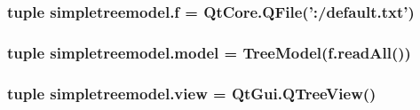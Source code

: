 \subsubsection[{f}]{\setlength{\rightskip}{0pt plus 5cm}tuple simpletreemodel.\+f = Qt\+Core.\+Q\+File('\+:/default.\+txt')}\label{namespacesimpletreemodel_a3f035ef87a5aa2abb8fbf618a27f931a}
\hypertarget{namespacesimpletreemodel_a7819016d83cff061893e791ada1a7537}{}
\subsubsection[{model}]{\setlength{\rightskip}{0pt plus 5cm}tuple simpletreemodel.\+model = {\bf Tree\+Model}(f.\+read\+All())}\label{namespacesimpletreemodel_a7819016d83cff061893e791ada1a7537}
\hypertarget{namespacesimpletreemodel_a413eefcad78a800c8118faef88c5e481}{}
\subsubsection[{view}]{\setlength{\rightskip}{0pt plus 5cm}tuple simpletreemodel.\+view = Qt\+Gui.\+Q\+Tree\+View()}\label{namespacesimpletreemodel_a413eefcad78a800c8118faef88c5e481}
